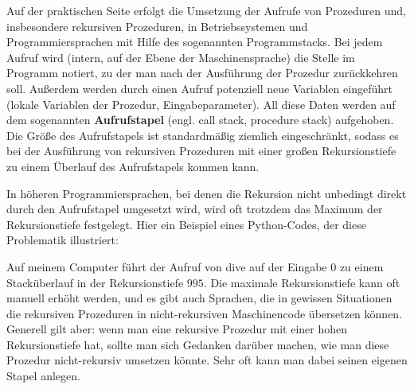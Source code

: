 \begin{bem}
	Auf der praktischen Seite erfolgt die Umsetzung der Aufrufe von Prozeduren und, insbesondere rekursiven Prozeduren, in Betriebssystemen und Programmiersprachen mit Hilfe des sogenannten Programmstacks. Bei jedem Aufruf wird (intern, auf der Ebene der Maschinensprache) die Stelle im Programm notiert, zu der man nach der Ausführung  der Prozedur zurückkehren soll. Außerdem werden durch einen Aufruf potenziell neue Variablen eingeführt (lokale Variablen der Prozedur, Eingabeparameter). All diese Daten werden auf dem sogenannten \textbf{Aufrufstapel} (engl. call stack, procedure stack) aufgehoben. Die Größe des Aufrufstapels ist standardmäßig ziemlich eingeschränkt, sodass es bei der Ausführung von rekursiven Prozeduren mit einer großen Rekursionstiefe zu einem Überlauf des Aufrufstapels kommen kann. 
	
	In höheren Programmiersprachen, bei denen die Rekursion nicht unbedingt direkt durch den Aufrufstapel umgesetzt wird, wird oft trotzdem das Maximum der Rekursionstiefe festgelegt. 	Hier ein Beispiel eines Python-Codes, der diese Problematik illustriert: 
	
	
	Auf meinem Computer führt der Aufruf von dive auf der Eingabe $0$ zu einem Stacküberlauf in der Rekursionstiefe $995$. Die maximale Rekursionstiefe kann oft manuell erhöht werden, und es gibt auch Sprachen, die in gewissen Situationen die rekursiven Prozeduren in nicht-rekursiven Maschinencode übersetzen können. Generell gilt aber: wenn man eine rekursive Prozedur mit einer hohen Rekursionstiefe hat, sollte man sich Gedanken darüber machen, wie man diese Prozedur nicht-rekursiv umsetzen könnte. Sehr oft kann man dabei seinen eigenen Stapel anlegen. 
\end{bem} 

